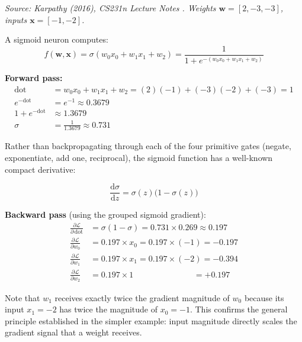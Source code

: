 \documentclass[12pt, a4paper]{article}
\begin{document}
\textit{Source: Karpathy (2016), CS231n Lecture Notes \cite{karpathy2016cs231n}.
Weights $\mathbf{w} = [2, -3, -3]$, inputs $\mathbf{x} = [-1, -2]$.}

\medskip
A sigmoid neuron computes:
\begin{equation}
    f(\mathbf{w}, \mathbf{x})
    = \sigma\!\left(w_0 x_0 + w_1 x_1 + w_2\right)
    = \frac{1}{1 + e^{-(w_0 x_0 + w_1 x_1 + w_2)}}
    \label{eq:sigmoid_neuron}
\end{equation}

\textbf{Forward pass:}
\begin{align}
    \text{dot} &= w_0 x_0 + w_1 x_1 + w_2
               = (2)(-1) + (-3)(-2) + (-3) = 1 \label{eq:sig_dot}\\
    e^{-\text{dot}} &= e^{-1} \approx 0.3679 \label{eq:sig_exp}\\
    1 + e^{-\text{dot}} &\approx 1.3679 \label{eq:sig_add}\\
    \sigma &= \frac{1}{1.3679} \approx \mathbf{0.731} \label{eq:sig_out}
\end{align}

Rather than backpropagating through each of the four primitive gates (negate,
exponentiate, add one, reciprocal), the sigmoid function has a well-known compact
derivative:

\begin{equation}
    \frac{\mathrm{d}\sigma}{\mathrm{d}z} = \sigma(z)\bigl(1 - \sigma(z)\bigr)
    \label{eq:sigmoid_deriv}
\end{equation}

\textbf{Backward pass} (using the grouped sigmoid gradient):
\begin{align}
    \frac{\partial \mathcal{L}}{\partial \,\text{dot}}
    &= \sigma(1 - \sigma) = 0.731 \times 0.269 \approx \mathbf{0.197}
    \label{eq:sig_bwd_dot}\\[4pt]
    \frac{\partial \mathcal{L}}{\partial w_0}
    &= 0.197 \times x_0 = 0.197 \times (-1) = \mathbf{-0.197}
    \label{eq:sig_bwd_w0}\\[4pt]
    \frac{\partial \mathcal{L}}{\partial w_1}
    &= 0.197 \times x_1 = 0.197 \times (-2) = \mathbf{-0.394}
    \label{eq:sig_bwd_w1}\\[4pt]
    \frac{\partial \mathcal{L}}{\partial w_2}
    &= 0.197 \times 1 \phantom{= 0.197 \times (-)} = \mathbf{+0.197}
    \label{eq:sig_bwd_w2}
\end{align}

Note that $w_1$ receives exactly twice the gradient magnitude of $w_0$ because
its input $x_1 = -2$ has twice the magnitude of $x_0 = -1$. This confirms the
general principle established in the simpler example: input magnitude directly
scales the gradient signal that a weight receives.
\end{document}
